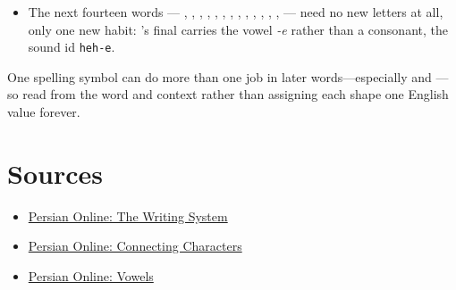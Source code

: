 \begin{itemize}
  \item The next fourteen words — \textbf{}, \textbf{}, \textbf{}, \textbf{}, \textbf{}, \textbf{}, \textbf{}, \textbf{}, \textbf{}, \textbf{}, \textbf{}, \textbf{}, \textbf{}, \textbf{} — need no new letters at all, only one new habit: \textbf{}'s final \textbf{} carries the vowel \emph{-e} rather than a consonant, the sound id \texttt{heh-e}.
\end{itemize}

One spelling symbol can do more than one job in later words—especially \textbf{} and \textbf{}—so read from the word and context rather than assigning each shape one English value forever.

\section*{Sources}

\begin{itemize}
\raggedright
\setlength{\itemsep}{0.35em}
  \item \href{https://sites.la.utexas.edu/persian\_online\_resources/the-writing-system/}{Persian Online: The Writing System}
  \item \href{https://sites.la.utexas.edu/persian\_online\_resources/the-writing-system/initial-medial-final-and-freestanding-letters/}{Persian Online: Connecting Characters}
  \item \href{https://sites.la.utexas.edu/persian\_online\_resources/phonology/phonology-1/}{Persian Online: Vowels}
\end{itemize}
